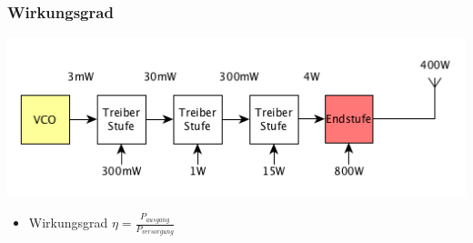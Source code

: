 \begin{frame}
    \frametitle{Wirkungsgrad}
    \begin{center}
        \includegraphics[width=1\textwidth]{a07/paBsb.png} \huge
     	\begin{itemize}
			\item Wirkungsgrad $\eta = \frac{P_{ausgang}}{P_{versorgung}}$
    	\end{itemize}
    \end{center}
\end{frame}

